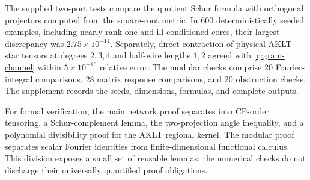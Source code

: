 The supplied two-port tests compare the quotient Schur formula with
orthogonal projectors computed from the square-root metric.  In 600
deterministically seeded examples, including nearly rank-one and
ill-conditioned cores, their largest discrepancy was
$2.75\times10^{-14}$.  Separately, direct contraction of physical AKLT
star tensors at degrees $2,3,4$ and half-wire lengths $1,2$ agreed with
\eqref{q:gram-channel} within $5\times10^{-16}$ relative error.
The modular checks comprise 20 Fourier-integral comparisons, 28 matrix
response comparisons, and 20 obstruction checks.  The supplement records
the seeds, dimensions, formulas, and complete outputs.

For formal verification, the main network proof separates into CP-order
tensoring, a Schur-complement lemma, the two-projection angle inequality,
and a polynomial divisibility proof for the AKLT regional kernel.  The
modular proof separates scalar Fourier identities from finite-dimensional
functional calculus.  This division exposes a small set of reusable
lemmas; the numerical checks do not discharge their universally
quantified proof obligations.

